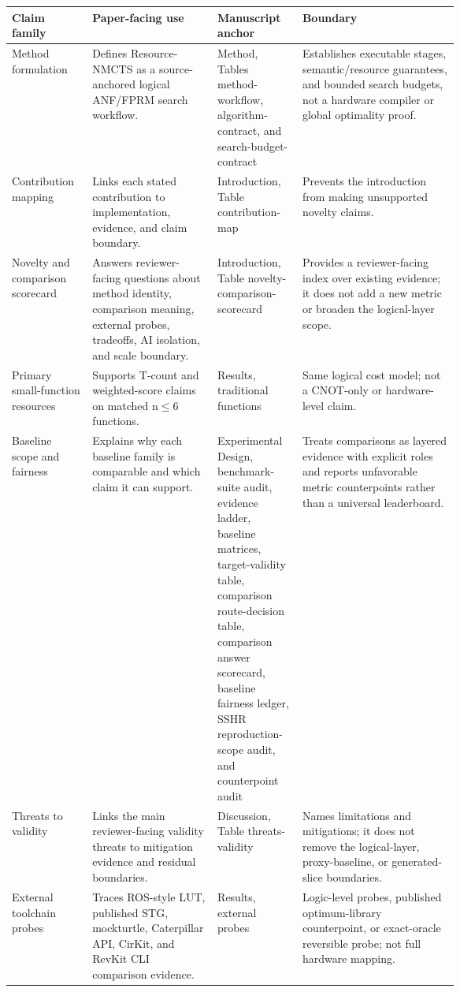 \begin{tabularx}{\linewidth}{>{\raggedright\arraybackslash}p{0.18\linewidth}>{\raggedright\arraybackslash}p{0.29\linewidth}>{\raggedright\arraybackslash}p{0.19\linewidth}>{\raggedright\arraybackslash}X}
\toprule
Claim family & Paper-facing use & Manuscript anchor & Boundary \\
\midrule
Method formulation & Defines Resource-NMCTS as a source-anchored logical ANF/FPRM search workflow. & Method, Tables method-workflow, algorithm-contract, and search-budget-contract & Establishes executable stages, semantic/resource guarantees, and bounded search budgets, not a hardware compiler or global optimality proof. \\
Contribution mapping & Links each stated contribution to implementation, evidence, and claim boundary. & Introduction, Table contribution-map & Prevents the introduction from making unsupported novelty claims. \\
Novelty and comparison scorecard & Answers reviewer-facing questions about method identity, comparison meaning, external probes, tradeoffs, AI isolation, and scale boundary. & Introduction, Table novelty-comparison-scorecard & Provides a reviewer-facing index over existing evidence; it does not add a new metric or broaden the logical-layer scope. \\
Primary small-function resources & Supports T-count and weighted-score claims on matched n$\leq$6 functions. & Results, traditional functions & Same logical cost model; not a CNOT-only or hardware-level claim. \\
Baseline scope and fairness & Explains why each baseline family is comparable and which claim it can support. & Experimental Design, benchmark-suite audit, evidence ladder, baseline matrices, target-validity table, comparison route-decision table, comparison answer scorecard, baseline fairness ledger, SSHR reproduction-scope audit, and counterpoint audit & Treats comparisons as layered evidence with explicit roles and reports unfavorable metric counterpoints rather than a universal leaderboard. \\
Threats to validity & Links the main reviewer-facing validity threats to mitigation evidence and residual boundaries. & Discussion, Table threats-validity & Names limitations and mitigations; it does not remove the logical-layer, proxy-baseline, or generated-slice boundaries. \\
External toolchain probes & Traces ROS-style LUT, published STG, mockturtle, Caterpillar API, CirKit, and RevKit CLI comparison evidence. & Results, external probes & Logic-level probes, published optimum-library counterpoint, or exact-oracle reversible probe; not full hardware mapping. \\

\end{tabularx}

